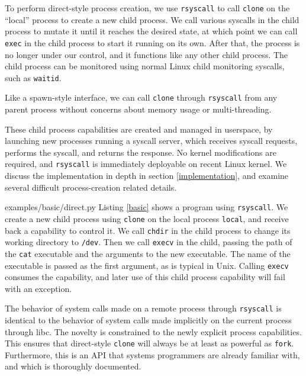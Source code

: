 \documentclass[letterpaper,twocolumn,10pt]{article}
\begin{document}
To perform direct-style process creation,
we use \texttt{rsyscall} to call \texttt{clone} on the ``local'' process to create a new child process.
We call various syscalls in the child process to mutate it until it reaches the desired state,
at which point we can call \texttt{exec} in the child process to start it running on its own.
After that, the process is no longer under our control, and it functions like any other child process.
The child process can be monitored using normal Linux child monitoring syscalls,
such as \texttt{waitid}.

Like a spawn-style interface,
we can call \texttt{clone} through \texttt{rsyscall} from any parent process
without concerns about memory usage or multi-threading.

These child process capabilities are created and managed in userspace,
by launching new processes running a syscall server,
which receives syscall requests, performs the syscall, and returns the response.
No kernel modifications are required, and \texttt{rsyscall} is immediately deployable on recent Linux kernel.
We discuss the implementation in depth in section \ref{implementation},
and examine several difficult process-creation related details.


{examples/basic/direct.py}
Listing \ref{basic} shows a program using \texttt{rsyscall}.
We create a new child process using \texttt{clone} on the local process \verb|local|,
and receive back a capability to control it.
We call \texttt{chdir} in the child process to change its working directory to \texttt{/dev}.
Then we call \texttt{execv} in the child,
passing the path of the \texttt{cat} executable
and the arguments to the new executable.
The name of the executable is passed as the first argument,
as is typical in Unix.
Calling \texttt{execv} consumes the capability,
and later use of this child process capability will fail with an exception.

The behavior of system calls made on a remote process through \texttt{rsyscall}
is identical to the behavior of system calls made implicitly on the current process through libc.
The novelty is constrained to the newly explicit process capabilities.
This ensures that direct-style \texttt{clone} will always be at least as powerful as \texttt{fork}.
Furthermore, this is an API that systems programmers are already familiar with,
and which is thoroughly documented.\cite{manpages}\cite{tlpi}
\end{document}
